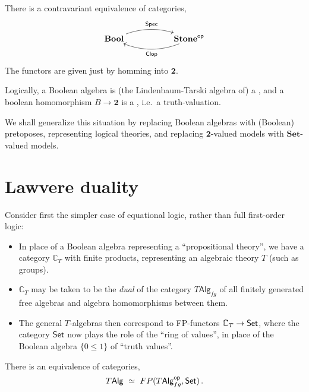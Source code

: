\documentclass[lambek.tex]{subfiles}
\begin{document}
There is a contravariant equivalence of categories,
\[
\xymatrix{ 
\mathbf{Bool}  \ar@/{}^{1pc}/[rr]^{\mathsf{Spec}}     &&  \mathbf{Stone}^{\mathsf{op}}  \ar@/{}^{1pc}/[ll]^{\mathsf{Clop}}  \\
} 
\]
The functors are given just by homming into $\mathbf{2}$.
\medskip

Logically, a Boolean algebra is (the Lindenbaum-Tarski algebra of) a , and a boolean homomorphism $B\to \mathbf{2}$ is a , i.e.\ a truth-valuation.
\medskip

We shall generalize this situation by replacing Boolean algebras with (Boolean) pretoposes, representing  logical theories, and replacing $\mathbf{2}$-valued models with $\mathbf{Set}$-valued models.

\section{Lawvere duality}

Consider first the simpler case of equational logic, rather than full first-order logic:
\begin{itemize}

\item In place of a Boolean algebra representing a ``propositional theory'', we have a category $\mathbb{C}_T$ with finite products, representing an algebraic theory $T$ (such as groups). 

\item $\mathbb{C}_T$ may be taken to be the \emph{dual}  of the category $T\mathsf{Alg}_{fg}$ of all finitely generated free algebras and algebra homomorphisms between them.


\item The general $T$-algebras then correspond to FP-functors $\mathbb{C}_T \to \mathsf{Set}$, where the category $\mathsf{Set}$ now plays the role of the ``ring of values'', in place of the Boolean algebra $\{ 0 \leq 1\}$ of ``truth values''. 
\end{itemize}


\begin{theorem}[Lawvere 1963]
There is an equivalence of categories,
\[
T\mathsf{Alg}\ \simeq\ FP(T\mathsf{Alg}_{fg}^\mathsf{op}, \Set)\,.
\]
\end{theorem}
\end{document}
